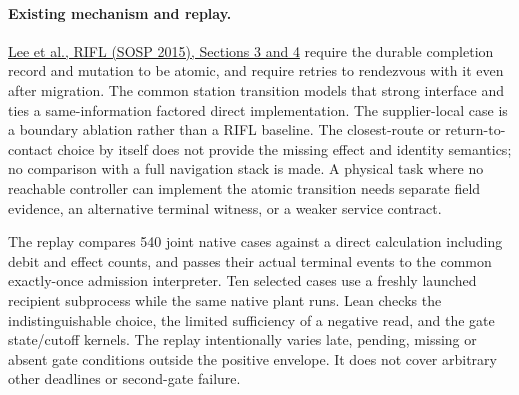 \documentclass{article}
\begin{document}
\paragraph{Existing mechanism and replay.}
\href{https://web.stanford.edu/~ouster/cgi-bin/papers/rifl.pdf}{Lee et al.,
RIFL (SOSP 2015), Sections 3 and 4} require the durable completion record
and mutation to be atomic, and require retries to rendezvous with it even
after migration. The common station transition models that strong interface
and ties a same-information factored direct implementation. The supplier-local
case is a boundary ablation rather than a RIFL baseline. The closest-route
or return-to-contact choice by itself does not provide the missing effect
and identity semantics; no comparison with a full navigation stack is made.
A physical task where no reachable controller can implement the atomic
transition needs separate field evidence, an alternative terminal witness,
or a weaker service contract.

The replay compares 540 joint native cases against a direct calculation
including debit and effect counts, and passes their actual terminal events
to the common exactly-once admission interpreter. Ten selected cases use
a freshly launched recipient subprocess while the same native plant runs.
Lean checks the indistinguishable choice, the limited sufficiency of a
negative read, and the gate state/cutoff kernels. The replay intentionally
varies late, pending, missing or absent gate conditions outside the positive
envelope. It does not cover arbitrary other deadlines or second-gate failure.
\end{document}

